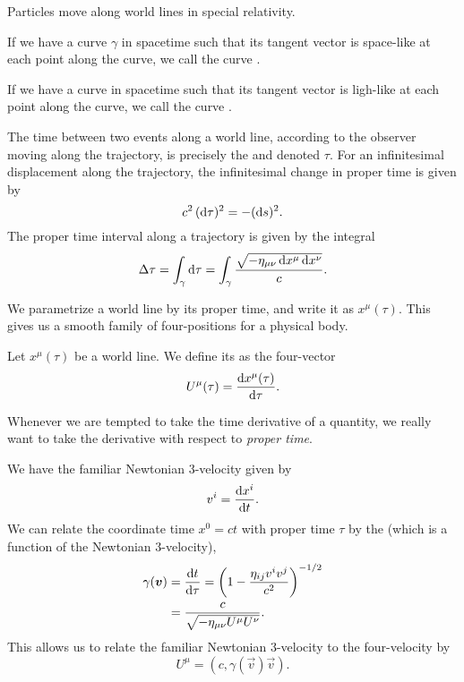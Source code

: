 Particles move along world lines in special relativity.

\M
If we have a curve $\gamma$ in spacetime such that its tangent vector is
space-like at each point along the curve, we call the curve
.

If we have a curve in spacetime such that its tangent vector is
ligh-like at each point along the curve, we call the curve
. 


The time between two events along a world line, according to the
observer moving along the trajectory, is precisely the
 and denoted $\tau$. For an infinitesimal
displacement along the trajectory, the infinitesimal change in proper
time is given by
\begin{equation}
c^{2}\,(\mathrm{d}\tau)^{2} = -(\mathrm{d} s)^{2}.
\end{equation}
The proper time interval along a trajectory is given by the integral
\begin{equation}
\Delta\tau = \int_{\gamma}\mathrm{d}\tau =
\int_{\gamma}\frac{\sqrt{-\eta_{\mu\nu}\,\mathrm{d} x^{\mu}\,\mathrm{d} x^{\nu}}}{c}.
\end{equation}

We parametrize a world line by its proper time, and write it as
$x^{\mu}(\tau)$. This gives us a smooth family of four-positions for a
physical body.

\begin{definition}
Let $x^{\mu}(\tau)$ be a world line. We define its 
as the four-vector
\begin{equation*}
U^{\mu}(\tau) = \frac{\mathrm{d} x^{\mu}(\tau)}{\mathrm{d}\tau}.
\end{equation*}
\end{definition}

\begin{remark}
Whenever we are tempted to take the time derivative of a quantity, we
really want to take the derivative with respect to \emph{proper time}.
\end{remark}

We have the familiar Newtonian 3-velocity given by
\begin{equation}
v^{i} = \frac{\mathrm{d} x^{i}}{\mathrm{d} t}.
\end{equation}
We can relate the coordinate time $x^{0}=ct$ with proper time $\tau$ by
the  (which is a function of the Newtonian 3-velocity),
\begin{equation}
  \begin{split}
\gamma(\boldsymbol{v}) &= \frac{\mathrm{d} t}{\mathrm{d}\tau} = \left(1 - \frac{\eta_{ij}v^{i}v^{j}}{c^{2}}\right)^{-1/2}\\
&=\frac{c}{\sqrt{-\eta_{\mu\nu}U^{\mu}U^{\nu}}}.
  \end{split}
\end{equation}
This allows us to relate the familiar Newtonian 3-velocity
to the four-velocity by
\begin{equation}
U^{\mu} = (c, \gamma(\vec{v})\vec{v}).
\end{equation}

